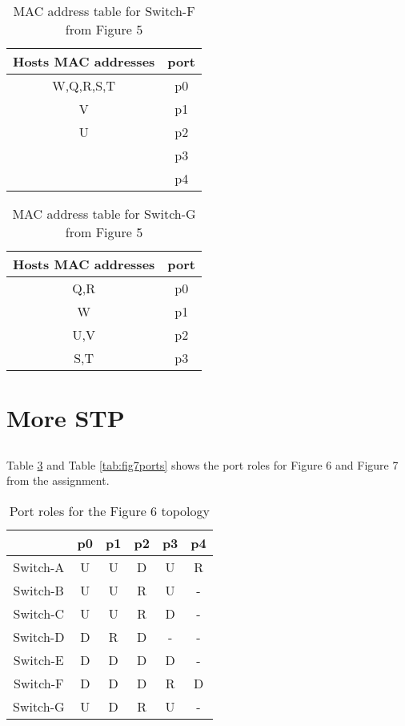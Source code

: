 \documentclass{article}
\begin{document}
\begin{table}[!h]
    \centering
    \begin{tabular}{|c|c|}
        \hline
        Hosts MAC addresses & port \\ \hline
                 W,Q,R,S,T          & p0   \\ 
               V            & p1   \\ 
                U           & p2   \\ 
                           & p3   \\
                           & p4  \\
        \hline
    \end{tabular}
    \caption{MAC address table for Switch-F from Figure 5}
    \label{tab:bmac}
\end{table}

\begin{table}[!h]
    \centering
    \begin{tabular}{|c|c|}
        \hline
        Hosts MAC addresses & port \\ \hline
             Q,R              & p0   \\ 
            W           & p1   \\ 
              U,V           & p2   \\ 
             S,T              & p3   \\
        \hline
    \end{tabular}
    \caption{MAC address table for Switch-G from Figure 5}
    \label{tab:bmac}
\end{table}

\section{More STP}

\subsection{}

Table \ref{tab:fig6ports} and Table  \ref{tab:fig7ports} shows the port roles for Figure 6 and Figure 7 from the assignment. 

\begin{table}[!h]
      \centering
    \begin{tabular}{|c|c|c|c|c|c|}
    \hline
         & p0 & p1 & p2 & p3 & p4 \\
    \hline
    Switch-A & U & U & D & U & R \\ 
    Switch-B & U & U & R & U & - \\
    Switch-C & U & U & R & D & - \\
    Switch-D & D & R & D & - & - \\
    Switch-E & D & D & D & D & - \\
    Switch-F & D & D & D & R & D \\
    Switch-G & U & D & R & U & - \\
    \hline
    \end{tabular}
    \caption{Port roles for the Figure 6 topology}
    \label{tab:fig6ports}
\end{table}
\end{document}
